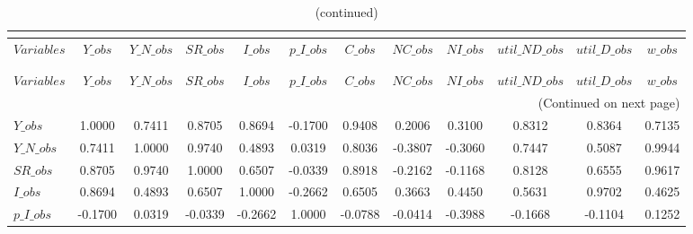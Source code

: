  
\begin{center}
\begin{longtable}{lccccccccccc} 
\caption{MATRIX OF CORRELATIONS}\\
 \label{Table:th_corr_matrix}\\
\toprule 
$Variables      $	 & 	 $          Y\_obs$	 & 	 $      Y\_N\_obs$	 & 	 $         SR\_obs$	 & 	 $          I\_obs$	 & 	 $      p\_I\_obs$	 & 	 $          C\_obs$	 & 	 $         NC\_obs$	 & 	 $         NI\_obs$	 & 	 $  util\_ND\_obs$	 & 	 $   util\_D\_obs$	 & 	 $          w\_obs$\\
\midrule \endfirsthead 
\caption{(continued)}\\
 \toprule \\ 
$Variables      $	 & 	 $          Y\_obs$	 & 	 $      Y\_N\_obs$	 & 	 $         SR\_obs$	 & 	 $          I\_obs$	 & 	 $      p\_I\_obs$	 & 	 $          C\_obs$	 & 	 $         NC\_obs$	 & 	 $         NI\_obs$	 & 	 $  util\_ND\_obs$	 & 	 $   util\_D\_obs$	 & 	 $          w\_obs$\\
\midrule \endhead 
\midrule \multicolumn{12}{r}{(Continued on next page)} \\ \bottomrule \endfoot 
\bottomrule \endlastfoot 
$Y\_obs         $	 & 	           1.0000	 & 	           0.7411	 & 	           0.8705	 & 	           0.8694	 & 	          -0.1700	 & 	           0.9408	 & 	           0.2006	 & 	           0.3100	 & 	           0.8312	 & 	           0.8364	 & 	           0.7135 \\ 
$Y\_N\_obs      $	 & 	           0.7411	 & 	           1.0000	 & 	           0.9740	 & 	           0.4893	 & 	           0.0319	 & 	           0.8036	 & 	          -0.3807	 & 	          -0.3060	 & 	           0.7447	 & 	           0.5087	 & 	           0.9944 \\ 
$SR\_obs        $	 & 	           0.8705	 & 	           0.9740	 & 	           1.0000	 & 	           0.6507	 & 	          -0.0339	 & 	           0.8918	 & 	          -0.2162	 & 	          -0.1168	 & 	           0.8128	 & 	           0.6555	 & 	           0.9617 \\ 
$I\_obs         $	 & 	           0.8694	 & 	           0.4893	 & 	           0.6507	 & 	           1.0000	 & 	          -0.2662	 & 	           0.6505	 & 	           0.3663	 & 	           0.4450	 & 	           0.5631	 & 	           0.9702	 & 	           0.4625 \\ 
$p\_I\_obs      $	 & 	          -0.1700	 & 	           0.0319	 & 	          -0.0339	 & 	          -0.2662	 & 	           1.0000	 & 	          -0.0788	 & 	          -0.0414	 & 	          -0.3988	 & 	          -0.1668	 & 	          -0.1104	 & 	           0.1252 \\ 

\end{longtable}
\end{center}
